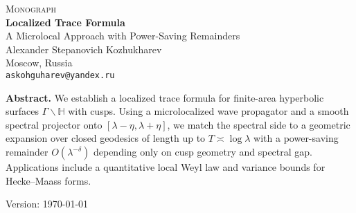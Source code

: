 \begin{titlepage}
  \centering
  \vspace*{6mm}
  {\Large\scshape Monograph}\\[12mm]
  {\LARGE\bfseries Localized Trace Formula}\\[4mm]
  {\large A Microlocal Approach with Power-Saving Remainders}\\[16mm]

  {\large Alexander Stepanovich Kozhukharev}\\[2mm]
  Moscow, Russia\\[2mm]
  \texttt{askohguharev@yandex.ru}\\[14mm]

  \vfill

  \begin{tcolorbox}[colback=white,colframe=black!15,sharp corners,boxrule=0.3pt]
    \small
    \textbf{Abstract.}\;
    We establish a localized trace formula for finite-area hyperbolic surfaces
    $\Gamma\backslash\mathbb{H}$ with cusps. Using a microlocalized wave propagator
    and a smooth spectral projector onto $[\lambda-\eta,\lambda+\eta]$, we match the
    spectral side to a geometric expansion over closed geodesics of length up to
    $T\asymp\log\lambda$ with a power-saving remainder $O(\lambda^{-\delta})$
    depending only on cusp geometry and spectral gap. Applications include a
    quantitative local Weyl law and variance bounds for Hecke--Maass forms.
  \end{tcolorbox}

  \vfill
  {\small Version: \today}
\end{titlepage}

\setcounter{page}{1}

\tableofcontents
\clearpage














